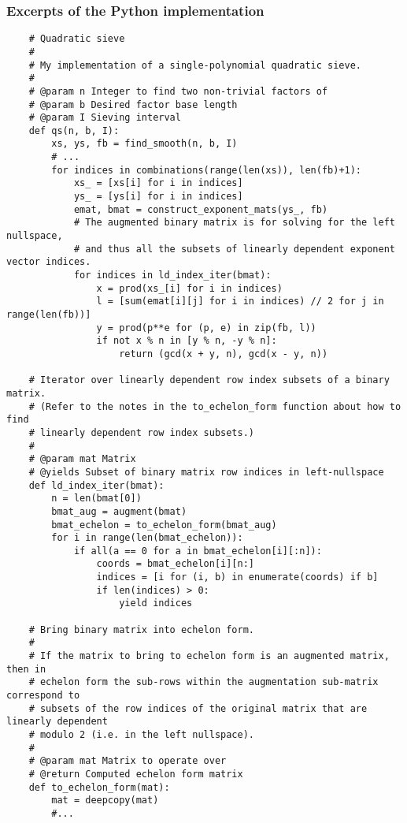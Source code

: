 \documentclass{report}
\begin{document}
\subsubsection*{Excerpts of the Python implementation}
\begin{verbatim}
    # Quadratic sieve
    #
    # My implementation of a single-polynomial quadratic sieve.
    #
    # @param n Integer to find two non-trivial factors of
    # @param b Desired factor base length
    # @param I Sieving interval
    def qs(n, b, I):
        xs, ys, fb = find_smooth(n, b, I)
        # ...
        for indices in combinations(range(len(xs)), len(fb)+1):
            xs_ = [xs[i] for i in indices]
            ys_ = [ys[i] for i in indices]
            emat, bmat = construct_exponent_mats(ys_, fb)
            # The augmented binary matrix is for solving for the left nullspace,
            # and thus all the subsets of linearly dependent exponent vector indices.
            for indices in ld_index_iter(bmat):
                x = prod(xs_[i] for i in indices)
                l = [sum(emat[i][j] for i in indices) // 2 for j in range(len(fb))]
                y = prod(p**e for (p, e) in zip(fb, l))
                if not x % n in [y % n, -y % n]:
                    return (gcd(x + y, n), gcd(x - y, n))

    # Iterator over linearly dependent row index subsets of a binary matrix.
    # (Refer to the notes in the to_echelon_form function about how to find
    # linearly dependent row index subsets.)
    #
    # @param mat Matrix
    # @yields Subset of binary matrix row indices in left-nullspace
    def ld_index_iter(bmat):
        n = len(bmat[0])
        bmat_aug = augment(bmat)
        bmat_echelon = to_echelon_form(bmat_aug)
        for i in range(len(bmat_echelon)):
            if all(a == 0 for a in bmat_echelon[i][:n]):
                coords = bmat_echelon[i][n:]
                indices = [i for (i, b) in enumerate(coords) if b]
                if len(indices) > 0:
                    yield indices

    # Bring binary matrix into echelon form.
    #
    # If the matrix to bring to echelon form is an augmented matrix, then in
    # echelon form the sub-rows within the augmentation sub-matrix correspond to
    # subsets of the row indices of the original matrix that are linearly dependent
    # modulo 2 (i.e. in the left nullspace).
    #
    # @param mat Matrix to operate over
    # @return Computed echelon form matrix
    def to_echelon_form(mat):
        mat = deepcopy(mat)
        #...
\end{verbatim}
\end{document}
